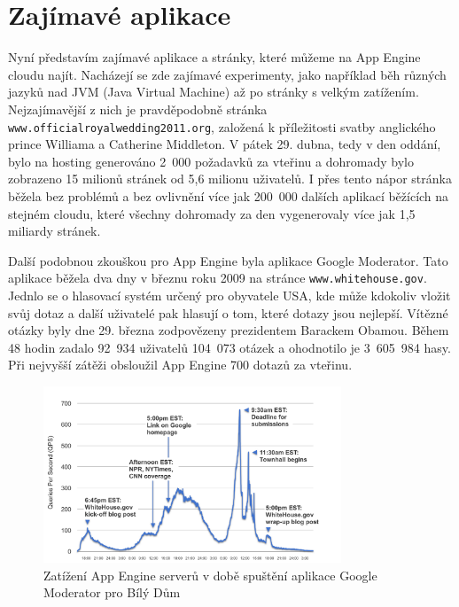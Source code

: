 \section{Zajímavé aplikace}
Nyní představím zajímavé aplikace a stránky, které můžeme na App Engine cloudu najít. Nacházejí se zde zajímavé experimenty, jako například běh různých jazyků nad JVM (Java Virtual Machine) až po stránky s velkým zatížením. Nejzajímavější z nich je pravděpodobně stránka \verb|www.officialroyalwedding2011.org|, založená k příležitosti svatby anglického prince Williama a Catherine Middleton. V pátek 29. dubna, tedy v den oddání, bylo na hosting generováno 2~000 požadavků za vteřinu a dohromady bylo zobrazeno 15 milionů stránek od 5,6 milionu uživatelů. I přes tento nápor stránka běžela bez problémů a bez ovlivnění více jak 200~000 dalších aplikací běžících na stejném cloudu, které všechny dohromady za den vygenerovaly více jak 1,5 miliardy stránek. \cite{royal-wedding}

Další podobnou zkouškou pro App Engine byla aplikace Google Moderator. Tato aplikace běžela dva dny v březnu roku 2009 na stránce \verb|www.whitehouse.gov|. Jednlo se o hlasovací systém určený pro obyvatele USA, kde může kdokoliv vložit svůj dotaz a další uživatelé pak hlasují o tom, které dotazy jsou nejlepší. Vítězné otázky byly dne 29. března zodpovězeny prezidentem Barackem Obamou. Během 48 hodin zadalo 92~934 uživatelů 104~073 otázek a ohodnotilo je 3~605~984 hasy. Při nejvyšší zátěži obsloužil App Engine 700 dotazů za vteřinu. \cite{whitehouse-app}

\begin{figure}[h]
\begin{center}
\includegraphics[width=3.5in]{figures/townhallgraphic.png}
\caption{Zatížení App Engine serverů v době spuštění aplikace Google Moderator pro Bílý Dům \cite{whitehouse-app}}
\label{whitehouse-app-picutre}
\end{center}
\end{figure}

